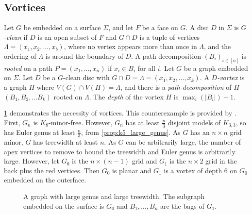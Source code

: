 \subsection{Vortices}\label{sssec:vortices}
Let \(G\) be embedded on a surface \(\Sigma\), and let \(F\) be a face on \(G\). A disc $D$ in $\Sigma$ is \textit{$G$-clean} if $D$ is an open subset of $F$ and $G \cap D$ is a tuple of vertices \(\Lambda = (x_1, x_2, \ldots, x_b)\), where no vertex appears more than once in $\Lambda$, and the ordering of $\Lambda$ is around the boundary of $D$. A path-decomposition $(B_i)_{i \in [n]}$ is \textit{rooted} on a path $P = (x_1, \ldots, x_n)$ if $x_i \in B_i$ for all $i$.
Let $G$ be a graph embedded on $\Sigma$. Let $D$ be a $G$-clean disc with $G \cap D = \Lambda = (x_1, x_2, \ldots, x_k)$. A \textit{$D$-vortex} is a graph $H$ where $V(G) \cap V(H) = \Lambda$, and there is a \textit{path-decomposition} of \(H\) \((B_1, B_2, \ldots B_k)\) rooted on $\Lambda$. The \textit{depth} of the vortex $H$ is $\max_{i}(|B_i|) - 1$. 

\cref{fig:tenniscourt} demonstrates the necessity of vortices. This counterexample is provided by \textcite{seeseGridsTheirMinors1989}. First, $G_n$ is $K_8$-minor-free. However, $G_n$ has at least $\frac{n}{3}$ disjoint models of $K_{3,3}$, so has Euler genus at least $\frac{n}{3}$, from \cref{prop:k5_large_genus}. As $G$ has an $n \times n$ grid minor, $G$ has treewidth at least $n$. As $G$ can be arbitrarily large, the number of apex vertices to remove to bound the treewidth and Euler genus is arbitrarily large. However, let $G_0$ is the $n \times (n - 1)$ grid and $G_1$ is the $n \times 2$ grid in the back plus the red vertices. Then $G_0$ is planar and $G_1$ is a vortex of depth 6 on $G_0$ embedded on the outerface.

\begin{figure}[h]
	\centering
	
	\caption[Graph vortex counterexample]{A graph with large genus and large treewidth. The subgraph embedded on the surface is $G_0$ and $B_1, \ldots, B_n$ are the bags of $G_1$.}\label{fig:tenniscourt}
\end{figure}

